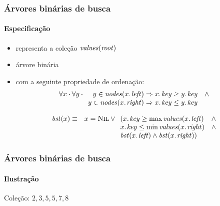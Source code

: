\documentclass{beamer}
\begin{document}
\begin{frame}

\frametitle{Árvores binárias de busca}
\framesubtitle{Especificação}

\begin{itemize}
\item representa a coleção $\id{values}(\id{root})$
\item árvore binária
\item com a seguinte propriedade de ordenação:
$$
\forall x \cdot 
\forall y \cdot
\begin{array}[t]{rl}
y \in \id{nodes}(\attrib{x}{left}) \Rightarrow \attrib{x}{key} \ge \attrib{y}{key} & \land \\
y \in \id{nodes}(\attrib{x}{right}) \Rightarrow \attrib{x}{key} \le \attrib{y}{key} &
\end{array}
$$

\begin{eqnarray*}
\id{bst}(x) & \equiv &
x = \const{Nil} \lor
\begin{array}[t]{ll}
  (\attrib{x}{key} \ge \max \id{values}(\attrib{x}{left}) & \land \\
  \attrib{x}{key} \le \min \id{values}(\attrib{x}{right}) & \land \\
  \id{bst}{(\attrib{x}{left}}) \land \id{bst}({\attrib{x}{right}}) )
\end{array}
\end{eqnarray*}
\end{itemize}

\end{frame}

\begin{frame}

\frametitle{Árvores binárias de busca}
\framesubtitle{Ilustração}

  Coleção: $2, 3, 5, 5, 7, 8$

  \begin{itemize}
  \end{itemize}

\end{frame}
\end{document}
